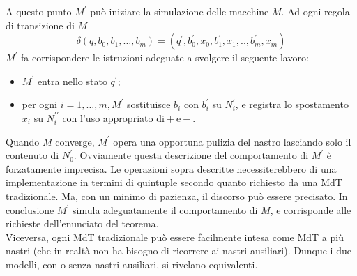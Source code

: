 A questo punto $M^{\prime}$ può iniziare la simulazione delle macchine $M$. Ad ogni
regola di transizione di $M$
$$
    \delta\left(q, b_0, b_1, \ldots, b_m\right)=\left(q^{\prime}, b_0^{\prime}, x_0, b_1^{\prime}, x_1, . ., b_m^{\prime}, x_m\right)
$$
$M^{\prime}$ fa corrispondere le istruzioni adeguate a svolgere il seguente lavoro:

\begin{itemize}
    \item $M^{\prime}$ entra nello stato $q^{\prime}$;
    \item per ogni $i=1, \ldots, m, M^{\prime}$ sostituisce $b_i$ con $b_i^{\prime}$
          su $N_i^{\prime}$, e registra lo spostamento $x_i$ su $N_i^{\prime \prime}$ con
          l'uso appropriato $\mathrm{di}+\mathrm{e}-$.
\end{itemize}

Quando $M$ converge, $M^{\prime}$ opera una opportuna pulizia del nastro lasciando
solo il contenuto di $N_0^{\prime}$. Ovviamente questa descrizione del comportamento
di $M^{\prime}$ è forzatamente imprecisa. Le operazioni sopra descritte
necessiterebbero di una implementazione in termini di quintuple secondo quanto
richiesto da una MdT tradizionale. Ma, con un minimo di pazienza, il discorso può
essere precisato. In conclusione $M^{\prime}$ simula adeguatamente il comportamento di $M$, e
corrisponde alle richieste dell'enunciato del teorema.\\

Viceversa, ogni MdT tradizionale può essere facilmente intesa come MdT a più nastri
(che in realtà non ha bisogno di ricorrere ai nastri ausiliari). Dunque i due
modelli, con o senza nastri ausiliari, si rivelano equivalenti.